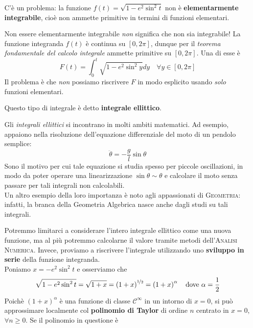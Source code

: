 C'è un problema: la funzione $f\left(t\right)=\sqrt{1-e^2\sin^2t}$ non è \textbf{elementarmente integrabile}, cioè non ammette primitive in termini di funzioni elementari.
\begin{attention}
	Non essere elementarmente integrabile \textit{non} significa che non sia integrabile! La funzione integranda $f\left(t\right)$ è continua su $\left[0, 2\pi\right]$, dunque per il \textit{teorema fondamentale del calcolo integrale} ammette primitive su $\left[0, 2\pi\right]$. Una di esse è
	\begin{equation*}
		F\left(t\right)=\int_{0}^{t}\sqrt{1-e^2\sin^2y}dy\quad\forall y\in\left[0,2\pi\right]
	\end{equation*}
	Il problema è che \textit{non} possiamo riscrivere $F$ in modo esplicito usando \textit{solo} funzioni elementari.
\end{attention}
Questo tipo di integrale è detto \textbf{integrale ellittico}.
\begin{digression}
	Gli \textit{integrali ellittici} si incontrano in molti ambiti matematici. Ad esempio, appaiono nella risoluzione dell'equazione differenziale del moto di un pendolo semplice:
	\begin{equation*}
		\ddot{\theta}=-\frac{g}{l}\sin\theta
	\end{equation*}
	Sono il motivo per cui tale equazione si studia spesso per piccole oscillazioni, in modo da poter operare una linearizzazione $\sin\theta\sim\theta$ e calcolare il moto senza passare per tali integrali non calcolabili.\\
	Un altro esempio della loro importanza è noto agli appassionati di \textsc{Geometria}: infatti, la branca della Geometria Algebrica nasce anche dagli studi su tali integrali.
\end{digression}
Potremmo limitarci a considerare l'intero integrale ellittico come una nuova funzione, ma al più potremmo calcolarne il valore tramite metodi dell'\textsc{Analisi Numerica}. Invece, proviamo a riscrivere l'integrale utilizzando uno \textbf{sviluppo in serie} della funzione integranda.\\
Poniamo $x=-e^2\sin^2t$ e osserviamo che
\begin{equation*}
	\sqrt{1-e^2\sin^2 t}=\sqrt{1+x}=\left(1+x\right)^{\nicefrac{1}{2}}=\left(1+x\right)^\alpha\quad\text{dove }\alpha=\frac{1}{2}
\end{equation*}
Poichè $\left(1+x\right)^\alpha$ è una funzione di classe $\mathcal{C}^\infty$ in un intorno di $x=0$, si può approssimare localmente col \textbf{polinomio di Taylor} di ordine $n$ centrato in $x=0$, $\forall n\geq 0$. Se il polinomio in questione è
